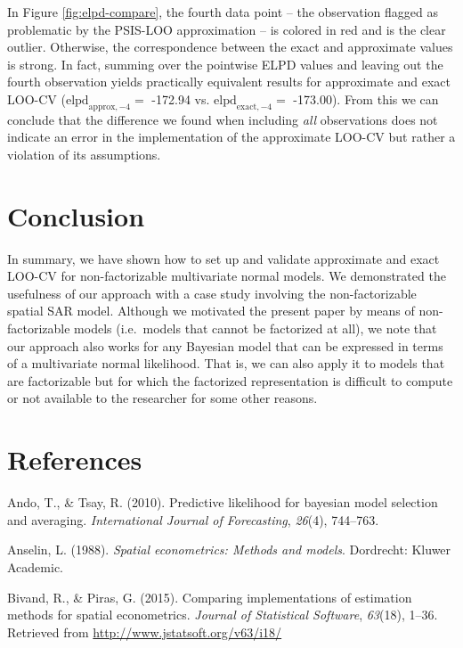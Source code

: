 \documentclass[english,,doc,floatsintext]{apa6}
\theoremstyle{definition}
\theoremstyle{definition}
\theoremstyle{definition}
\theoremstyle{remark}
\begin{document}
In Figure \ref{fig:elpd-compare}, the fourth data point -- the
observation flagged as problematic by the PSIS-LOO approximation -- is
colored in red and is the clear outlier. Otherwise, the correspondence
between the exact and approximate values is strong. In fact, summing
over the pointwise ELPD values and leaving out the fourth observation
yields practically equivalent results for approximate and exact LOO-CV
(\(\text{elpd}_{\text{approx},-4} =\) -172.94 vs.
\(\text{elpd}_{\text{exact},-4} =\) -173.00). From this we can conclude
that the difference we found when including \emph{all} observations does
not indicate an error in the implementation of the approximate LOO-CV
but rather a violation of its assumptions.

\hypertarget{conclusion}{%
\section{Conclusion}\label{conclusion}}

In summary, we have shown how to set up and validate approximate and
exact LOO-CV for non-factorizable multivariate normal models. We
demonstrated the usefulness of our approach with a case study involving
the non-factorizable spatial SAR model. Although we motivated the
present paper by means of non-factorizable models (i.e.~models that
cannot be factorized at all), we note that our approach also works for
any Bayesian model that can be expressed in terms of a multivariate
normal likelihood. That is, we can also apply it to models that are
factorizable but for which the factorized representation is difficult to
compute or not available to the researcher for some other reasons.

\hypertarget{references}{%
\section*{References}\label{references}}

\hypertarget{refs}{}
\leavevmode\hypertarget{ref-ando2010}{}%
Ando, T., \& Tsay, R. (2010). Predictive likelihood for bayesian model
selection and averaging. \emph{International Journal of Forecasting},
\emph{26}(4), 744--763.

\leavevmode\hypertarget{ref-anselin1988}{}%
Anselin, L. (1988). \emph{Spatial econometrics: Methods and models}.
Dordrecht: Kluwer Academic.

\leavevmode\hypertarget{ref-bivand2015}{}%
Bivand, R., \& Piras, G. (2015). Comparing implementations of estimation
methods for spatial econometrics. \emph{Journal of Statistical
Software}, \emph{63}(18), 1--36. Retrieved from
\url{http://www.jstatsoft.org/v63/i18/}
\end{document}
